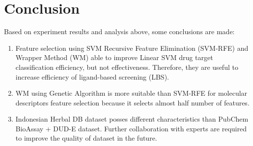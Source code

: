 \documentclass[conference,compsoc,12pt]{IEEEtran}
\begin{document}
	\section{Conclusion}
	
	Based on experiment results and analysis above, some conclusions are made:
	
	\begin{enumerate}
		\item Feature selection using SVM Recursive Feature Elimination (SVM-RFE) and Wrapper Method (WM) able to improve Linear SVM drug target classification efficiency, but not effectiveness. Therefore, they are useful to increase efficiency of ligand-based screening (LBS).
		\item WM using Genetic Algorithm is more suitable than SVM-RFE for molecular descriptors feature selection because it selects almost half number of features.
		\item Indonesian Herbal DB dataset posses different characteristics than PubChem BioAssay + DUD-E dataset. Further collaboration with experts are required to improve the quality of dataset in the future.
	\end{enumerate}
	
	
	
	
	
	
\end{document}
